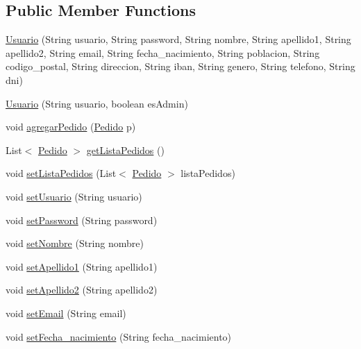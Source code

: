\subsection*{Public Member Functions}
\begin{DoxyCompactItemize}
\item 
\mbox{\hyperlink{classobjetos_1_1_usuario_a0d13573d3c808402df18a489ecb81654}{Usuario}} (String usuario, String password, String nombre, String apellido1, String apellido2, String email, String fecha\+\_\+nacimiento, String poblacion, String codigo\+\_\+postal, String direccion, String iban, String genero, String telefono, String dni)
\item 
\mbox{\hyperlink{classobjetos_1_1_usuario_aa3a7114995ef02ed515c668148eb2aca}{Usuario}} (String usuario, boolean es\+Admin)
\item 
void \mbox{\hyperlink{classobjetos_1_1_usuario_a1d3a6e897c852226d1b419c67089ec3b}{agregar\+Pedido}} (\mbox{\hyperlink{classobjetos_1_1_pedido}{Pedido}} p)
\item 
List$<$ \mbox{\hyperlink{classobjetos_1_1_pedido}{Pedido}} $>$ \mbox{\hyperlink{classobjetos_1_1_usuario_af3fd03fa3c7765c9005a75d70256288e}{get\+Lista\+Pedidos}} ()
\item 
void \mbox{\hyperlink{classobjetos_1_1_usuario_ab7bc0d18ecfee488dcf322094629ef5d}{set\+Lista\+Pedidos}} (List$<$ \mbox{\hyperlink{classobjetos_1_1_pedido}{Pedido}} $>$ lista\+Pedidos)
\item 
void \mbox{\hyperlink{classobjetos_1_1_usuario_a7be3dc8fe52e00029ec3a6ec763116e1}{set\+Usuario}} (String usuario)
\item 
void \mbox{\hyperlink{classobjetos_1_1_usuario_acebc98a73bf17db1fb88e476e64f2c6c}{set\+Password}} (String password)
\item 
void \mbox{\hyperlink{classobjetos_1_1_usuario_af80f3d60addfde641e49e66e6a1f5f8e}{set\+Nombre}} (String nombre)
\item 
void \mbox{\hyperlink{classobjetos_1_1_usuario_a705188b9b04c0e4cfcad7f2973f7673e}{set\+Apellido1}} (String apellido1)
\item 
void \mbox{\hyperlink{classobjetos_1_1_usuario_a73a071e063ba33c64d1453bf788b1d2f}{set\+Apellido2}} (String apellido2)
\item 
void \mbox{\hyperlink{classobjetos_1_1_usuario_ad64ef1b4bc35e4039e9e5f31d651e043}{set\+Email}} (String email)
\item 
void \mbox{\hyperlink{classobjetos_1_1_usuario_a5d99fa41f8ec817e0eca78ef718a3771}{set\+Fecha\+\_\+nacimiento}} (String fecha\+\_\+nacimiento)

\end{DoxyCompactItemize}
